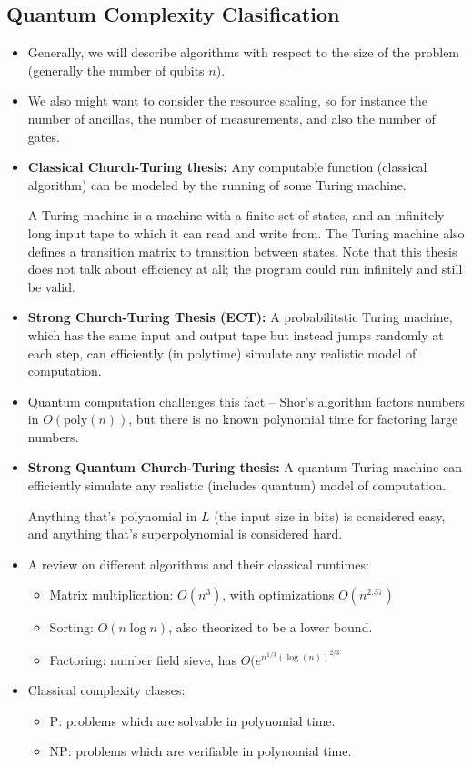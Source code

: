 \subsection{Quantum Complexity Clasification}
\begin{itemize}
	\item Generally, we will describe algorithms with respect to the size of the problem (generally 
		the number of qubits \( n \)). 
		
	\item We also might want to consider the resource scaling, so for instance the number of ancillas, the number 
		of measurements, and also the number of gates. 
	\item \textbf{Classical Church-Turing thesis:} Any computable function (classical algorithm) can be modeled by  
		the running of some Turing machine.

		A Turing machine is a machine with a finite set of states, and an infinitely long input tape to which 
		it can read and write from. The Turing machine also defines a transition matrix to transition between states.
		Note that this thesis does not talk about efficiency at all; the program could run infinitely and still 
		be valid. 
	\item \textbf{Strong Church-Turing Thesis (ECT):} A probabilitstic Turing machine, which has the same 
		input and output tape but instead jumps randomly at each step, can efficiently (in polytime) 
		simulate any realistic 
		model of computation. 
	\item Quantum computation challenges this fact -- Shor's algorithm factors numbers in \( O(\text{poly}(n)) \), 
		but there is no known polynomial time for factoring large numbers.
	\item \textbf{Strong Quantum Church-Turing thesis:} A quantum Turing machine can efficiently 
		simulate any realistic (includes quantum) model of computation.

		Anything that's polynomial in \( L \) (the input size in bits) is considered easy, and anything 
		that's superpolynomial is considered hard. 
	\item A review on different algorithms and their classical runtimes:
		\begin{itemize}
			\item Matrix multiplication: \( O(n^3) \), with optimizations \( O(n^{2.37}) \) 
			\item Sorting: \( O(n \log n) \), also theorized to be a lower bound.
			\item Factoring: number field sieve, has \( O(e^{n^{1 / 3} (\log(n))^{2 / 3}} \)
		\end{itemize}
	\item Classical complexity classes:
		\begin{itemize}
			\item P: problems which are solvable in polynomial time.
			\item NP: problems which are verifiable in polynomial time. 


\end{itemize}
\end{itemize}
